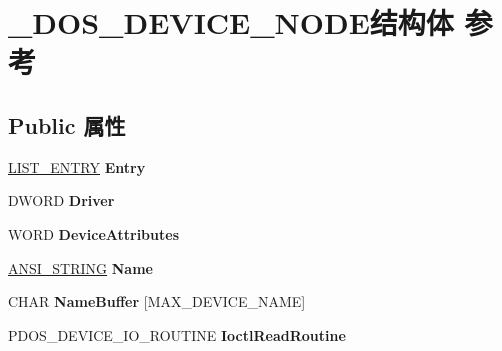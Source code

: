 \hypertarget{struct___d_o_s___d_e_v_i_c_e___n_o_d_e}{}\section{\+\_\+\+D\+O\+S\+\_\+\+D\+E\+V\+I\+C\+E\+\_\+\+N\+O\+D\+E结构体 参考}
\label{struct___d_o_s___d_e_v_i_c_e___n_o_d_e}
\subsection*{Public 属性}
\begin{DoxyCompactItemize}
\item 
\mbox{\label{struct___d_o_s___d_e_v_i_c_e___n_o_d_e_af54897873147ced51524adb8708e1d7b}} 
\hyperlink{struct___l_i_s_t___e_n_t_r_y}{L\+I\+S\+T\+\_\+\+E\+N\+T\+RY} {\bfseries Entry}
\item 
\mbox{\label{struct___d_o_s___d_e_v_i_c_e___n_o_d_e_aafecec9b87ccc48ae2a63b16ad644174}} 
D\+W\+O\+RD {\bfseries Driver}
\item 
\mbox{\label{struct___d_o_s___d_e_v_i_c_e___n_o_d_e_a2ec7c2cda539f6d2647a7e0e1bef6075}} 
W\+O\+RD {\bfseries Device\+Attributes}
\item 
\mbox{\label{struct___d_o_s___d_e_v_i_c_e___n_o_d_e_ace2ba26f90c6ebf13fbaf67194b9e93b}} 
\hyperlink{struct___a_n_s_i___s_t_r_i_n_g}{A\+N\+S\+I\+\_\+\+S\+T\+R\+I\+NG} {\bfseries Name}
\item 
\mbox{\label{struct___d_o_s___d_e_v_i_c_e___n_o_d_e_a9761cc3f19e9ac4e6d06ae69b0f8a7d4}} 
C\+H\+AR {\bfseries Name\+Buffer} \mbox{[}M\+A\+X\+\_\+\+D\+E\+V\+I\+C\+E\+\_\+\+N\+A\+ME\mbox{]}
\item 
\mbox{\label{struct___d_o_s___d_e_v_i_c_e___n_o_d_e_a6e5fedf57b6aed5a21b217a109a46603}} 
P\+D\+O\+S\+\_\+\+D\+E\+V\+I\+C\+E\+\_\+\+I\+O\+\_\+\+R\+O\+U\+T\+I\+NE {\bfseries Ioctl\+Read\+Routine}
\item 
\mbox{\label{struct___d_o_s___d_e_v_i_c_e___n_o_d_e_a4bc52456268146293400faad975e8662}} 

\end{DoxyCompactItemize}
